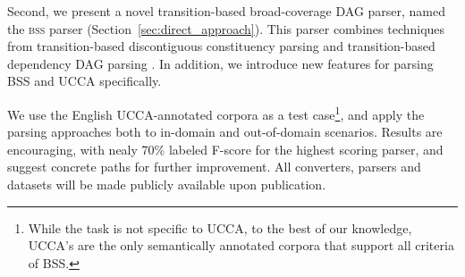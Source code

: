 \documentclass[11pt]{article}
\newcommand{\secref}[1]{Section~\ref{#1}}
\begin{document}
Second, we present a novel transition-based broad-coverage DAG parser, named
the \textsc{bss} parser (\secref{sec:direct_approach}).
This parser combines techniques from transition-based discontiguous constituency parsing \cite{maier2015discontinuous} and transition-based dependency DAG parsing \cite{tokgoz2015transition}. In addition, we introduce new features for parsing BSS and UCCA specifically.


We use the English UCCA-annotated corpora \cite{abend2013universal} as a test
case\footnote{While the task is not specific to UCCA,
  to the best of our knowledge, UCCA's are the only
  semantically annotated corpora that support all criteria of BSS.},
and apply the parsing approaches both to in-domain and out-of-domain scenarios.
Results are encouraging, with nealy 70\% labeled F-score for the highest
scoring parser, and suggest concrete paths for further improvement.
All converters, parsers and datasets will be made publicly available upon publication.

\end{document}
